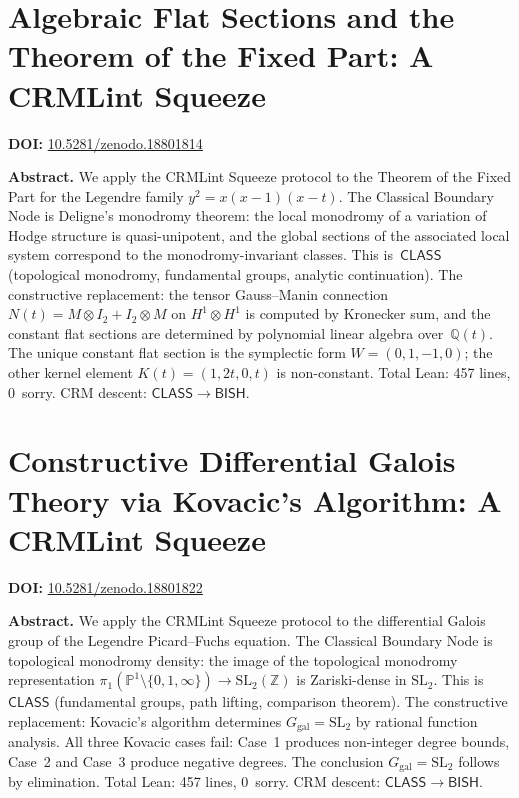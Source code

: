 \documentclass[11pt,a4paper]{article}
\begin{document}
\section{Algebraic Flat Sections and the Theorem of the Fixed Part: A CRMLint Squeeze}
\label{sec:p81}
\textbf{DOI:} \href{https://doi.org/10.5281/zenodo.18801814}{10.5281/zenodo.18801814}

\bigskip
\noindent\textbf{Abstract.}
We apply the CRMLint Squeeze protocol to the Theorem of the Fixed Part for the Legendre family $y^2 = x(x-1)(x-t)$. The Classical Boundary Node is Deligne's monodromy theorem: the local monodromy of a variation of Hodge structure is quasi-unipotent, and the global sections of the associated local system correspond to the monodromy-invariant classes. This is~$\mathsf{CLASS}$ (topological monodromy, fundamental groups, analytic continuation). The constructive replacement: the tensor Gauss--Manin connection $N(t) = M \otimes I_2 + I_2 \otimes M$ on $H^1 \otimes H^1$ is computed by Kronecker sum, and the constant flat sections are determined by polynomial linear algebra over~$\mathbb{Q}(t)$. The unique constant flat section is the symplectic form $W = (0,1,-1,0)$; the other kernel element $K(t) = (1, 2t, 0, t)$ is non-constant. Total Lean: 457 lines, 0~sorry. CRM descent: $\mathsf{CLASS} \to \mathsf{BISH}$.

\section{Constructive Differential Galois Theory via Kovacic's Algorithm: A CRMLint Squeeze}
\label{sec:p82}
\textbf{DOI:} \href{https://doi.org/10.5281/zenodo.18801822}{10.5281/zenodo.18801822}

\bigskip
\noindent\textbf{Abstract.}
We apply the CRMLint Squeeze protocol to the differential Galois group of the Legendre Picard--Fuchs equation. The Classical Boundary Node is topological monodromy density: the image of the topological monodromy representation $\pi_1(\mathbb{P}^1 \setminus \{0,1,\infty\}) \to \mathrm{SL}_2(\mathbb{Z})$ is Zariski-dense in $\mathrm{SL}_2$. This is~$\mathsf{CLASS}$ (fundamental groups, path lifting, comparison theorem). The constructive replacement: Kovacic's algorithm determines $G_{\mathrm{gal}} = \mathrm{SL}_2$ by rational function analysis. All three Kovacic cases fail: Case~1 produces non-integer degree bounds, Case~2 and Case~3 produce negative degrees. The conclusion $G_{\mathrm{gal}} = \mathrm{SL}_2$ follows by elimination. Total Lean: 457 lines, 0~sorry. CRM descent: $\mathsf{CLASS} \to \mathsf{BISH}$.
\end{document}
